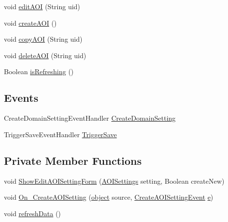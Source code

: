 \begin{DoxyCompactItemize}
\item 
void \hyperlink{class_web_analyzer_1_1_u_i_1_1_interaction_objects_1_1_domain_setting_control_aaffb07c5ebd6252c650723134ac9c0f4}{edit\+A\+O\+I} (String uid)
\item 
void \hyperlink{class_web_analyzer_1_1_u_i_1_1_interaction_objects_1_1_domain_setting_control_a26803d2f4b4e6d9b3b9746d245d45190}{create\+A\+O\+I} ()
\item 
void \hyperlink{class_web_analyzer_1_1_u_i_1_1_interaction_objects_1_1_domain_setting_control_ade3c26de20eec061fccdbad1e33966e1}{copy\+A\+O\+I} (String uid)
\item 
void \hyperlink{class_web_analyzer_1_1_u_i_1_1_interaction_objects_1_1_domain_setting_control_a9eb07ab9de98ec5b9f4d2ef662fa2970}{delete\+A\+O\+I} (String uid)
\item 
Boolean \hyperlink{class_web_analyzer_1_1_u_i_1_1_interaction_objects_1_1_domain_setting_control_ab7498deab19b4b9ce1a05a98f670c801}{is\+Refreshing} ()
\end{DoxyCompactItemize}
\subsection*{Events}
\begin{DoxyCompactItemize}
\item 
Create\+Domain\+Setting\+Event\+Handler \hyperlink{class_web_analyzer_1_1_u_i_1_1_interaction_objects_1_1_domain_setting_control_aff18f63d7e7cb4b8c5d62b881bfc685c}{Create\+Domain\+Setting}
\item 
Trigger\+Save\+Event\+Handler \hyperlink{class_web_analyzer_1_1_u_i_1_1_interaction_objects_1_1_domain_setting_control_a1daa9c774e823427b39110bc42ff0ccd}{Trigger\+Save}
\end{DoxyCompactItemize}
\subsection*{Private Member Functions}
\begin{DoxyCompactItemize}
\item 
void \hyperlink{class_web_analyzer_1_1_u_i_1_1_interaction_objects_1_1_domain_setting_control_a8482d6c6ca6f62a8182b8b9e7608ed92}{Show\+Edit\+A\+O\+I\+Setting\+Form} (\hyperlink{class_web_analyzer_1_1_models_1_1_settings_model_1_1_a_o_i_settings}{A\+O\+I\+Settings} setting, Boolean create\+New)
\item 
void \hyperlink{class_web_analyzer_1_1_u_i_1_1_interaction_objects_1_1_domain_setting_control_ab03466aaad4776710ba6517f80329b12}{On\+\_\+\+Create\+A\+O\+I\+Setting} (\hyperlink{_u_i_2_h_t_m_l_resources_2js_2lib_2underscore_8min_8js_aae18b7515bb2bc4137586506e7c0c903}{object} source, \hyperlink{class_web_analyzer_1_1_events_1_1_create_a_o_i_setting_event}{Create\+A\+O\+I\+Setting\+Event} \hyperlink{_u_i_2_h_t_m_l_resources_2js_2lib_2bootstrap_8min_8js_ab5902775854a8b8440bcd25e0fe1c120}{e})
\item 
void \hyperlink{class_web_analyzer_1_1_u_i_1_1_interaction_objects_1_1_domain_setting_control_a2f4338f90019c81d050af5e37be871de}{refresh\+Data} ()
\end{DoxyCompactItemize}

